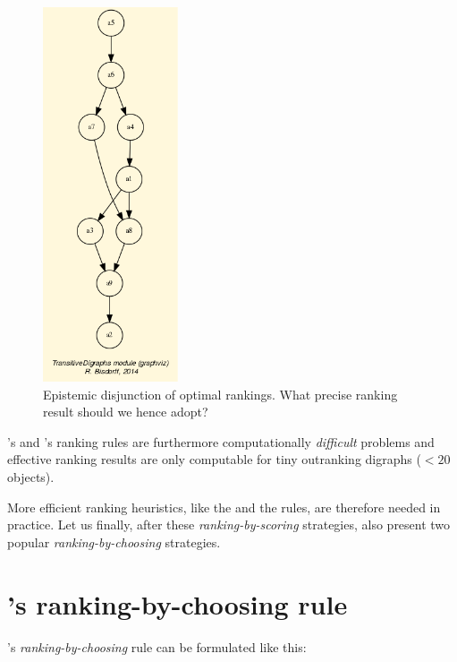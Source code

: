 \begin{figure}[h]
\sidecaption[t]
\includegraphics[width=4cm]{Figures/tutorialSlater.png}
\caption{Epistemic disjunction of optimal \Slater rankings. What precise \Slater ranking result should we hence adopt?}
\label{fig:8.4}       %
\end{figure}
       
\Kemeny 's and \Slater 's ranking rules are furthermore computationally \emph{difficult} problems and effective ranking results are only computable for tiny outranking digraphs ($< 20$ objects). 

More efficient ranking heuristics, like the \Copeland and the \NetFlows rules, are therefore needed in practice. Let us finally, after these \emph{ranking-by-scoring} strategies, also present two popular \emph{ranking-by-choosing} strategies.

\section{\Kohler 's ranking-by-choosing rule}
\label{sec:8.6}

\Kohler 's \emph{ranking-by-choosing} rule can be formulated like this:


